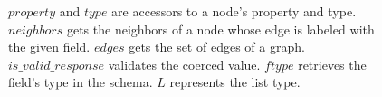\begin{figure}[t]
{{    $\mathit{property}$ and $\mathit{type}$ are accessors to a node's property and type. $\mathit{neighbors}$ gets the neighbors of a node whose edge is labeled with the given field.
    $\mathit{edges}$ gets the set of edges of a graph.  $\mathit{is\_valid\_response}$ validates the coerced value.
    $\mathit{ftype}$ retrieves the field's type in the schema. $L$ represents the list type.}}
    \label{fig:semantics}
\end{figure}



